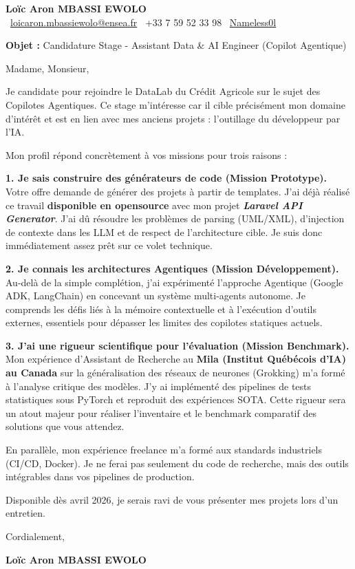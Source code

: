 \documentclass[11pt,a4paper]{article}
\begin{document}
\begin{center}
    {\Large \textbf{Loïc Aron MBASSI EWOLO}} \\
    \vspace{0.1cm}
    \small
    \faEnvelope\ \href{mailto:loicaron.mbassiewolo@ensea.fr}{loicaron.mbassiewolo@ensea.fr} \quad
    \faPhone\ +33 7 59 52 33 98 \quad
    \faGithub\ \href{https://github.com/Nameless0l}{Nameless0l}
\end{center}

\vspace{0.5cm}

\textbf{Objet :} Candidature Stage - Assistant Data \& AI Engineer (Copilot Agentique)

Madame, Monsieur,

Je candidate pour rejoindre le DataLab du Crédit Agricole sur le sujet des Copilotes Agentiques. Ce stage m'intéresse car il cible précisément mon domaine d'intérêt et est en lien avec mes anciens projets : l'outillage du développeur par l'IA.

Mon profil répond concrètement à vos missions pour trois raisons :

\textbf{1. Je sais construire des générateurs de code (Mission Prototype).}
Votre offre demande de générer des projets à partir de templates. J'ai déjà réalisé ce travail \textbf{disponible en opensource} avec mon projet \textit{\textbf{Laravel API Generator}}. J'ai dû résoudre les problèmes de parsing (UML/XML), d'injection de contexte dans les LLM et de respect de l'architecture cible. Je suis donc  immédiatement assez prêt sur ce volet technique.

\textbf{2. Je connais les architectures Agentiques (Mission Développement).}
Au-delà de la simple complétion, j'ai expérimenté l'approche Agentique (Google ADK, LangChain) en concevant un système multi-agents autonome. Je comprends les défis liés à la mémoire contextuelle et à l'exécution d'outils externes, essentiels pour dépasser les limites des copilotes statiques actuels.

\textbf{3. J'ai une rigueur scientifique pour l'évaluation (Mission Benchmark).}
Mon expérience d'Assistant de Recherche au \textbf{Mila (Institut Québécois d'IA) au Canada} sur la généralisation des réseaux de neurones (Grokking) m'a formé à l'analyse critique des modèles. J'y ai implémenté des pipelines de tests statistiques sous PyTorch et reproduit des expériences SOTA. Cette rigueur sera un atout majeur pour réaliser l'inventaire et le benchmark comparatif des solutions que vous attendez.

En parallèle, mon expérience freelance m'a formé aux standards industriels (CI/CD, Docker). Je ne ferai pas seulement du code de recherche, mais des outils intégrables dans vos pipelines de production.

Disponible dès avril 2026, je serais ravi de vous présenter mes projets lors d'un entretien.

Cordialement,

\vspace{0.5cm}

\textbf{Loïc Aron MBASSI EWOLO}
\end{document}
